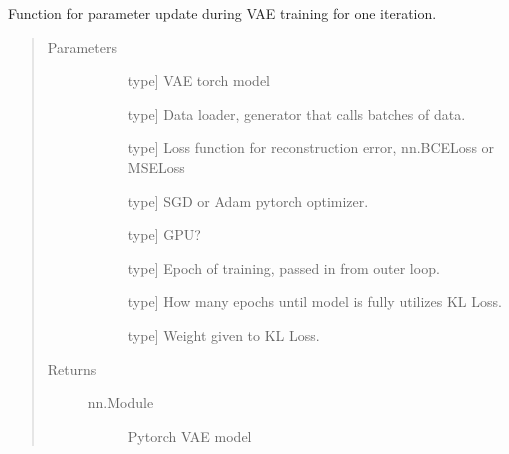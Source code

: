 \documentclass[letterpaper,10pt,english]{sphinxmanual}
\begin{document}

\begin{fulllineitems}
\label{\detokenize{index:methylnet.models.train_vae}}
Function for parameter update during VAE training for one iteration.
\begin{quote}\begin{description}
\item[{Parameters}] \leavevmode\begin{description}
\item[{}] \leavevmode{[}type{]}
VAE torch model

\item[{}] \leavevmode{[}type{]}
Data loader, generator that calls batches of data.

\item[{}] \leavevmode{[}type{]}
Loss function for reconstruction error, nn.BCELoss or MSELoss

\item[{}] \leavevmode{[}type{]}
SGD or Adam pytorch optimizer.

\item[{}] \leavevmode{[}type{]}
GPU?

\item[{}] \leavevmode{[}type{]}
Epoch of training, passed in from outer loop.

\item[{}] \leavevmode{[}type{]}
How many epochs until model is fully utilizes KL Loss.

\item[{}] \leavevmode{[}type{]}
Weight given to KL Loss.

\end{description}

\item[{Returns}] \leavevmode\begin{description}
\item[{nn.Module}] \leavevmode
Pytorch VAE model


\end{description}
\end{description}
\end{quote}
\end{fulllineitems}
\end{document}
